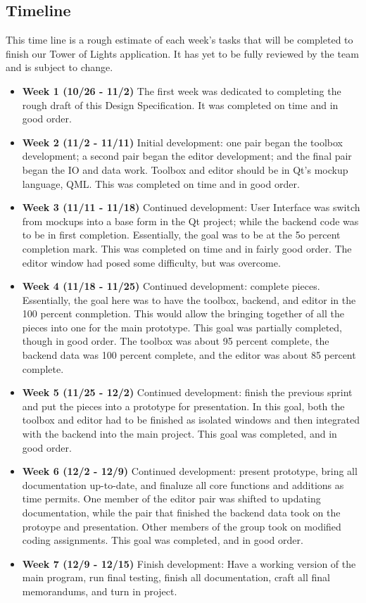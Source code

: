\documentclass[12pt]{extarticle}
\begin{document}
\subsection{Timeline}
This time line is a rough estimate of each week's tasks that will be completed to finish our Tower of Lights application. It has yet to be fully reviewed by the team and is subject to change.
	\begin{itemize}
		\item \textbf{Week 1 (10/26 - 11/2)} The first week was dedicated to completing the rough draft of this Design Specification. It was completed on time and in good order.
		\item \textbf{Week 2 (11/2 - 11/11)} Initial development: one pair began the toolbox development; a second pair began the editor development; and the final pair began the IO and data work.  Toolbox and editor should be in Qt's mockup language, QML.  This was completed on time and in good order.
		\item \textbf{Week 3 (11/11 - 11/18)} Continued development: User Interface was switch from mockups into a base form in the Qt project; while the backend code was to be in first completion.  Essentially, the goal was to be at the 5o percent completion mark.  This was completed on time and in fairly good order.  The editor window had posed some difficulty, but was overcome.
		\item \textbf{Week 4 (11/18 - 11/25)} Continued development: complete pieces.  Essentially, the goal here was to have the toolbox, backend, and editor in the 100 percent conmpletion.  This would allow the bringing together of all the pieces into one for the main prototype.  This goal was partially completed, though in good order.  The toolbox was about 95 percent complete, the backend data was 100 percent complete, and the editor was about 85 percent complete.  
		\item \textbf{Week 5 (11/25 - 12/2)} Continued development: finish the previous sprint and put the pieces into a prototype for presentation.  In this goal, both the toolbox and editor had to be finished as isolated windows and then integrated with the backend into the main project.  This goal was completed, and in good order.  
		\item \textbf{Week 6 (12/2 - 12/9)} Continued development: present prototype, bring all documentation up-to-date, and finaluze all core functions and additions as time permits.  One member of the editor pair was shifted to updating documentation, while the pair that finished the backend data took on the protoype and presentation.  Other members of the group took on modified coding assignments.  This goal was completed, and in good order.
		\item \textbf{Week 7 (12/9 - 12/15)} Finish development: Have a working version of the main program, run final testing, finish all documentation, craft all final memorandums, and turn in project.
	\end{itemize}
\end{document}
